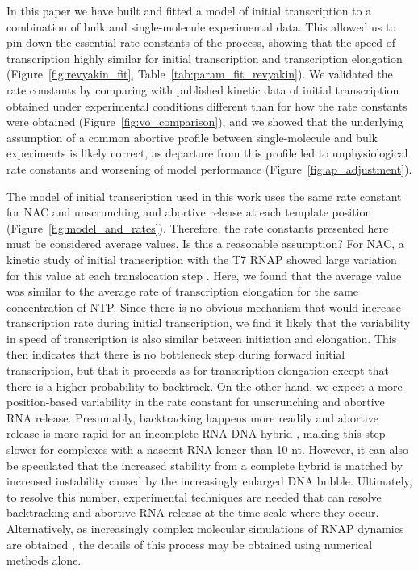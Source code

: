 %
In this paper we have built and fitted a model of initial transcription to a
combination of bulk and single-molecule experimental data. This allowed us
to pin down the essential rate constants of the process, showing that the
speed of transcription highly similar for initial transcription and
transcription elongation (Figure~\ref{fig:revyakin_fit},
Table~\ref{tab:param_fit_revyakin}). We validated the rate constants by
comparing with published kinetic data of initial transcription obtained under
experimental conditions different than for how the rate constants were
obtained (Figure~\ref{fig:vo_comparison}), and we showed that the underlying
assumption of a common abortive profile between single-molecule and bulk
experiments is likely correct, as departure from this profile led to
unphysiological rate constants and worsening of model performance
(Figure~\ref{fig:ap_adjustment}).

The model of initial transcription used in this work uses the same rate
constant for NAC and unscrunching and abortive release at each template
position (Figure~\ref{fig:model_and_rates}). Therefore, the rate constants
presented here must be considered average values. Is this a reasonable
assumption? For NAC, a kinetic study of initial transcription with the T7 RNAP
showed large variation for this value at each translocation step
\cite{tang_real-time_2009}. Here, we found that the average value was similar
to the average rate of transcription elongation for the same concentration of
NTP. Since there is no obvious mechanism that would increase transcription
rate during initial transcription, we find it likely that the variability in
speed of transcription is also similar between initiation and elongation. This
then indicates that there is no bottleneck step during forward initial
transcription, but that it proceeds as for transcription elongation except
that there is a higher probability to backtrack. On the other hand, we expect
a more position-based variability in the rate constant for unscrunching and
abortive RNA release. Presumably, backtracking happens more readily and
abortive release is more rapid for an incomplete RNA-DNA hybrid
\cite{nudler_rnadna_1997,komissarova_shortening_2002}, making this step slower
for complexes with a nascent RNA longer than 10 nt. However, it can also be
speculated that the increased stability from a complete hybrid is matched by
increased instability caused by the increasingly enlarged DNA bubble.
Ultimately, to resolve this number, experimental techniques are needed that
can resolve backtracking and abortive RNA release at the time scale where they
occur. Alternatively, as increasingly complex molecular simulations of RNAP
dynamics are obtained \cite{silva_millisecond_2014}, the details of this
process may be obtained using numerical methods alone.

